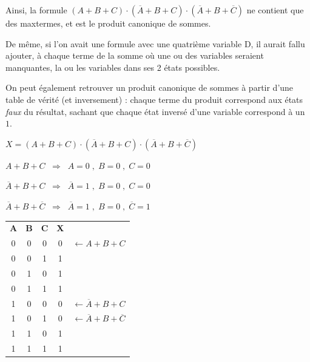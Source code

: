 \documentclass[11pt,a4paper]{article}
\begin{document}
\bigskip

Ainsi, la formule $ ( A + B + C ) \cdot ( \overline{A} + B + C ) \cdot ( \overline{A} + B + \overline{C} ) $ ne contient que des maxtermes, et est le produit canonique de sommes.

\smallskip

De même, si l'on avait une formule avec une quatrième variable D, il aurait fallu ajouter, à chaque terme de la somme où une ou des variables seraient manquantes, la ou les variables dans ses 2 états possibles.

\bigskip

On peut également retrouver un produit canonique de sommes à partir d'une table de vérité (et inversement) : chaque terme du produit correspond aux états \textit{faux} du résultat, sachant que chaque état inversé d'une variable correspond à un $ 1 $.

\begin{center}
$ X = (A + B + C) \cdot (\overline{A} + B + C) \cdot (\overline{A} + B + \overline{C}) $

\smallskip

$ A + B + C  \; \; \Rightarrow \; \;  A = 0 \; , \; B = 0 \; , \; C = 0 $

$ \overline{A} + B + C  \; \; \Rightarrow \; \;  \overline{A} = 1 \; , \; B = 0 \; , \; C = 0 $

$ \overline{A} + B + \overline{C}  \; \; \Rightarrow \; \;  \overline{A} = 1 \; , \; B = 0 \; , \; \overline{C} = 1 $

\medskip

\begin{tabular}{| c | c | c || c | l }
\cline{0-3}
\cellcolor{black!15} \textbf{A} & \cellcolor{black!15} \textbf{B} & \cellcolor{black!15} \textbf{C}  &  \cellcolor{black!15} \textbf{X}  & \\
\cline{0-3}
0 & 0 & 0  &  \cellcolor{black!15} 0  & $ \leftarrow  A + B + C $ \\ \cline{0-3}
0 & 0 & 1  &  \cellcolor{black!15} 1  & \\ \cline{0-3}
0 & 1 & 0  &  \cellcolor{black!15} 1  & \\ \cline{0-3}
0 & 1 & 1  &  \cellcolor{black!15} 1  & \\ \cline{0-3}
1 & 0 & 0  &  \cellcolor{black!15} 0  & $ \leftarrow \overline{A} + B + C $ \\ \cline{0-3}
1 & 0 & 1  &  \cellcolor{black!15} 0  & $ \leftarrow \overline{A} + B + \overline{C} $ \\ \cline{0-3}
1 & 1 & 0  &  \cellcolor{black!15} 1  & \\ \cline{0-3}
1 & 1 & 1  &  \cellcolor{black!15} 1  & \\ \cline{0-3}
\end{tabular}
\end{center}
\end{document}
